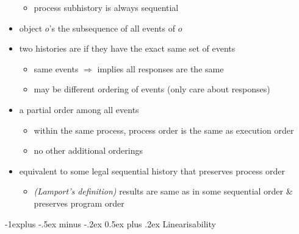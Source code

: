 \documentclass[10pt, landscape]{article}
\makeatletter
\renewcommand{\subsection}{\@startsection{subsection}{2}{0mm}%
  {-1explus -.5ex minus -.2ex}%
  {0.5ex plus .2ex}%
{\normalfont\normalsize\bfseries}}
\makeatother
\begin{document}
\begin{multicols*}{3}
\begin{itemize}
      \begin{itemize}
        \item process subhistory is always sequential
      \end{itemize}
    \item object $o$'s  the subsequence of all events of $o$
    \item two histories are  if they have the exact same set of events
      \begin{itemize}
        \item same events $\Rightarrow$ implies all responses are the same
        \item may be different ordering of events (only care about responses)
      \end{itemize}
    \item {} a partial order among all events
      \begin{itemize}
        \item within the same process, process order is the same as execution order
        \item no other additional orderings
      \end{itemize}
    \item {} equivalent to some legal sequential history that preserves process order
      \begin{itemize}
        \item \textit{(Lamport’s definition)} results are same as in some sequential order \& preserves program order
      \end{itemize}
  \end{itemize}

  \subsection{Linearisability}


\end{multicols*}
\end{document}
